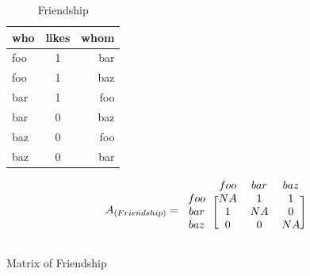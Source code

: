 \documentclass[twocolumn]{article} %
\begin{document}
\begin{table}[h!]
\begin{center}
\begin{tabular}{l|c|r}
\textbf{who} & \textbf{likes} & \textbf{whom}\\
\hline
foo & 1 & bar\\
foo & 1 & baz\\
bar & 1 & foo\\
bar & 0 & baz\\
baz & 0 & foo\\
baz & 0 & bar\\
\end{tabular}
\end{center}
\caption{Friendship}
\label{tab:1}
\end{table}
\begin{table}[h!]
\begin{center}
\begin{minipage}[!hbt]{.5\textwidth}
\[
A_{(Friendship)} =
\begin{blockarray}{cccc}
& foo & bar & baz \\
\begin{block}{c[ccc]}
foo & NA & 1 & 1 \\
bar & 1 & NA & 0 \\
baz & 0 & 0 & NA \\
\end{block}
\end{blockarray}
\]
\end{minipage}
\end{center}
\caption{Matrix of Friendship}
\label{tab:2}
\end{table}
\end{document}
